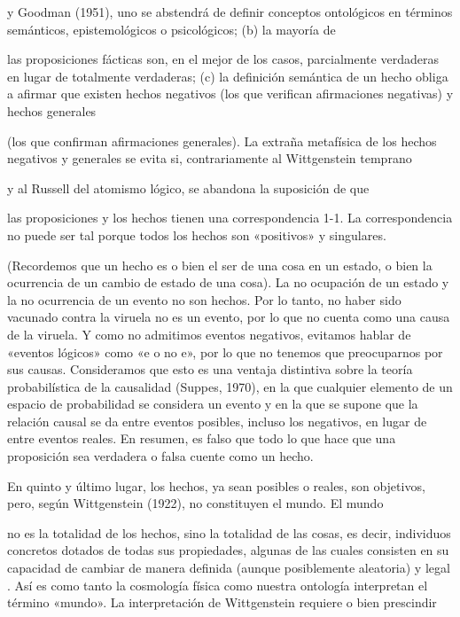 \begin{justifying}
  y Goodman (1951), uno se abstendrá de definir conceptos ontológicos
  en términos semánticos, epistemológicos o psicológicos; (b) la mayoría de

  las proposiciones fácticas son, en el mejor de los casos, parcialmente verdaderas en lugar de totalmente verdaderas; (c)
  la definición semántica de un hecho obliga a afirmar que existen
  hechos negativos (los que verifican afirmaciones negativas) y hechos generales

  (los que confirman afirmaciones generales). La extraña metafísica de los hechos negativos
  y generales se evita si, contrariamente al Wittgenstein temprano

  y al Russell del atomismo lógico, se abandona la suposición de que

  las proposiciones y los hechos tienen una correspondencia 1-1. La correspondencia
  no puede ser tal porque todos los hechos son «positivos» y singulares.

  (Recordemos que un hecho es o bien el ser de una cosa en un estado, o bien la
  ocurrencia de un cambio de estado de una cosa). La no ocupación de un estado
  y la no ocurrencia de un evento no son hechos. Por lo tanto, no haber sido
  vacunado contra la viruela no es un evento, por lo que no cuenta como una
  causa de la viruela. Y como no admitimos eventos negativos,
  evitamos hablar de «eventos lógicos» como «e o no e», por lo que no
  tenemos que preocuparnos por sus causas. Consideramos que esto es una ventaja distintiva
  sobre la teoría probabilística de la causalidad (Suppes, 1970),
  en la que cualquier elemento de un espacio de probabilidad se considera un evento y en la que
  se supone que la relación causal se da entre eventos posibles, incluso
  los negativos, en lugar de entre eventos reales. En resumen, es falso que
  todo lo que hace que una proposición sea verdadera o falsa cuente como un hecho.

  En quinto y último lugar, los hechos, ya sean posibles o reales, son objetivos, pero,
  según Wittgenstein (1922), no constituyen el mundo. El mundo

  no es la totalidad de los hechos, sino la totalidad de las cosas, es decir, individuos concretos
  dotados de todas sus propiedades, algunas de las cuales consisten en
  su capacidad de cambiar de manera definida (aunque posiblemente aleatoria) y legal
  . Así es como tanto la cosmología física como nuestra ontología interpretan
  el término «mundo». La interpretación de Wittgenstein requiere o bien prescindir


\end{justifying}
